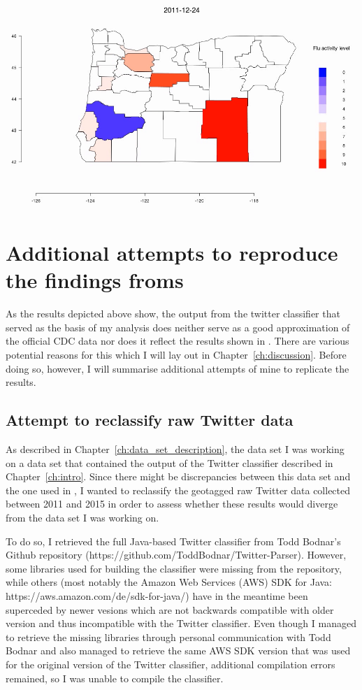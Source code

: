 \documentclass[11pt, a4paper,twoside]{report}\usepackage[]{graphicx}\usepackage[]{color}
\begin{document}
\centering \href{run:vids/county_Twitter_cdc_diff_oregon.avi}{\includegraphics[scale=0.5]{vids/Screenshot_Oregon.png}} 
\raggedright

\section{Additional attempts to reproduce the findings froms \citep{bodnar_data_2015}}
As the results depicted above show, the output from the twitter classifier that served as the basis of my analysis does neither serve as a good approximation of the official CDC data nor does it reflect the results shown in \citep{bodnar_data_2015}. There are various potential reasons for this which I will lay out in Chapter~\ref{ch:discussion}. Before doing so, however, I will summarise additional attempts of mine to replicate the results. \newline

\subsection{Attempt to reclassify raw Twitter data}
As described in Chapter~\ref{ch:data_set_description}, the data set I was working on a data set that contained the output of the Twitter classifier described in Chapter~\ref{ch:intro}. Since there might be discrepancies between this data set and the one used in \citep{bodnar_data_2015}, I wanted to reclassify the geotagged raw Twitter data collected between 2011 and 2015 in order to assess whether these results would diverge from the data set I was working on.\newline

To do so, I retrieved the full Java-based Twitter classifier from Todd Bodnar's Github repository (https://github.com/ToddBodnar/Twitter-Parser). However, some libraries used for building the classifier were missing from the repository, while others (most notably the Amazon Web Services (AWS) SDK for Java: https://aws.amazon.com/de/sdk-for-java/) have in the meantime been superceded by newer vesions which are not backwards compatible with older version and thus incompatible with the Twitter classifier. Even though I managed to retrieve the missing libraries through personal communication with Todd Bodnar and also managed to retrieve the same AWS SDK version that was used for the original version of the Twitter classifier, additional compilation errors remained, so I was unable to compile the classifier.\newline
\end{document}
